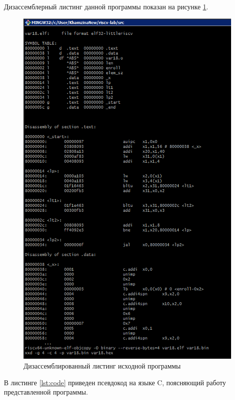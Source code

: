 Дизассемблерный листинг данной программы показан на рисунке \ref{img:code-disasm}.

\begin{figure}[H]
	\begin{center}
		\includegraphics[scale=0.7]{img/code_disasm.png}
	\end{center}
	\captionsetup{justification=centering}
	\caption{Дизассемблированный листинг исходной программы}
	\label{img:code-disasm}
\end{figure}

В листинге \ref{lst:code} приведен псевдокод на языке C, поясняющий работу представленной программы.


